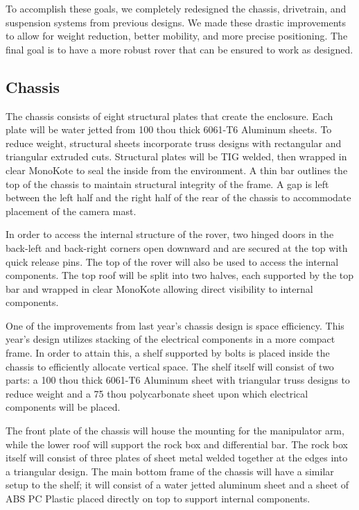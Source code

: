 \documentclass[titlepage,twocolumn,10pt]{article}
\begin{document}
    To accomplish these goals, we completely redesigned the chassis, drivetrain, and suspension systems from previous designs. We made these drastic improvements to allow for weight reduction, better mobility, and more precise positioning. The final goal is to have a more robust rover that can be ensured to work as designed.

    \subsection{Chassis}
    The chassis consists of eight structural plates that create the enclosure. Each plate will be water jetted from 100 thou thick 6061-T6 Aluminum sheets. To reduce weight, structural sheets incorporate truss designs with rectangular and triangular extruded cuts. Structural plates will be TIG welded, then wrapped in clear MonoKote to seal the inside from the environment. A thin bar outlines the top of the chassis to maintain structural integrity of the frame. A gap is left between the left half and the right half of the rear of the chassis to accommodate placement of the camera mast.

    In order to access the internal structure of the rover, two hinged doors in the back-left and back-right corners open downward and are secured at the top with quick release pins. The top of the rover will also be used to access the internal components. The top roof will be split into two halves, each supported by the top bar and wrapped in clear MonoKote allowing direct visibility to internal components.

    One of the improvements from last year's chassis design is space efficiency. This year's design utilizes stacking of the electrical components in a more compact frame. In order to attain this, a shelf supported by bolts is placed inside the chassis to efficiently allocate vertical space. The shelf itself will consist of two parts: a 100 thou thick 6061-T6 Aluminum sheet with triangular truss designs to reduce weight and a 75 thou polycarbonate sheet upon which electrical components will be placed.

    The front plate of the chassis will house the mounting for the manipulator arm, while the lower  roof will support the rock box and differential bar. The rock box itself will consist of three plates of sheet metal welded together at the edges into a triangular design. The main bottom frame of the chassis will have a similar setup to the shelf; it will consist of a water jetted aluminum sheet and a sheet of ABS PC Plastic placed directly on top to support internal components.
\end{document}

